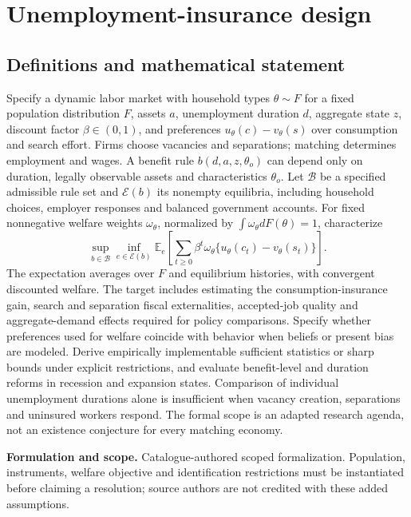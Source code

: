 \documentclass[11pt]{article}
\begin{document}
\section*{Unemployment-insurance design}\label{30007760}
\subsection{Definitions and mathematical statement}
Specify a dynamic labor market with household types \(\theta\sim F\) for a fixed population distribution \(F\), assets \(a\), unemployment duration \(d\), aggregate state \(z\), discount factor \(\beta\in(0,1)\), and preferences \(u_\theta(c)-v_\theta(s)\) over consumption and search effort. Firms choose vacancies and separations; matching determines employment and wages. A benefit rule \(b(d,a,z,\theta_o)\) can depend only on duration, legally observable assets and characteristics \(\theta_o\). Let \(\mathcal B\) be a specified admissible rule set and \(\mathcal E(b)\) its nonempty equilibria, including household choices, employer responses and balanced government accounts. For fixed nonnegative welfare weights \(\omega_\theta\), normalized by \(\int\omega_\theta dF(\theta)=1\), characterize
\[\sup_{b\in\mathcal B}\inf_{e\in\mathcal E(b)}\mathbb E_e\!\left[\sum_{t\geq0}\beta^t\omega_\theta\{u_\theta(c_t)-v_\theta(s_t)\}\right].\]
The expectation averages over \(F\) and equilibrium histories, with convergent discounted welfare. The target includes estimating the consumption-insurance gain, search and separation fiscal externalities, accepted-job quality and aggregate-demand effects required for policy comparisons. Specify whether preferences used for welfare coincide with behavior when beliefs or present bias are modeled. Derive empirically implementable sufficient statistics or sharp bounds under explicit restrictions, and evaluate benefit-level and duration reforms in recession and expansion states. Comparison of individual unemployment durations alone is insufficient when vacancy creation, separations and uninsured workers respond. The formal scope is an adapted research agenda, not an existence conjecture for every matching economy.

\par\textbf{Formulation and scope.} Catalogue-authored scoped formalization. Population, instruments, welfare objective and identification restrictions must be instantiated before claiming a resolution; source authors are not credited with these added assumptions.
\end{document}

